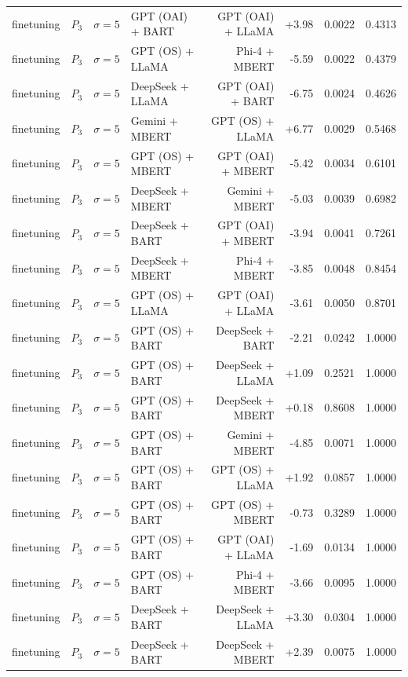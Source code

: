 \begin{table}[htbp]
\begin{tabular*}{\textwidth}{@{\extracolsep{\fill}}llllrrrl}
finetuning & $P_3$ & $\sigma{=}5$ & GPT (OAI) + BART & GPT (OAI) + LLaMA & +3.98 & 0.0022 & 0.4313 \\
finetuning & $P_3$ & $\sigma{=}5$ & GPT (OS) + LLaMA & Phi-4 + MBERT & -5.59 & 0.0022 & 0.4379 \\
finetuning & $P_3$ & $\sigma{=}5$ & DeepSeek + LLaMA & GPT (OAI) + BART & -6.75 & 0.0024 & 0.4626 \\
finetuning & $P_3$ & $\sigma{=}5$ & Gemini + MBERT & GPT (OS) + LLaMA & +6.77 & 0.0029 & 0.5468 \\
finetuning & $P_3$ & $\sigma{=}5$ & GPT (OS) + MBERT & GPT (OAI) + MBERT & -5.42 & 0.0034 & 0.6101 \\
finetuning & $P_3$ & $\sigma{=}5$ & DeepSeek + MBERT & Gemini + MBERT & -5.03 & 0.0039 & 0.6982 \\
finetuning & $P_3$ & $\sigma{=}5$ & DeepSeek + BART & GPT (OAI) + MBERT & -3.94 & 0.0041 & 0.7261 \\
finetuning & $P_3$ & $\sigma{=}5$ & DeepSeek + MBERT & Phi-4 + MBERT & -3.85 & 0.0048 & 0.8454 \\
finetuning & $P_3$ & $\sigma{=}5$ & GPT (OS) + LLaMA & GPT (OAI) + LLaMA & -3.61 & 0.0050 & 0.8701 \\
finetuning & $P_3$ & $\sigma{=}5$ & GPT (OS) + BART & DeepSeek + BART & -2.21 & 0.0242 & 1.0000 \\
finetuning & $P_3$ & $\sigma{=}5$ & GPT (OS) + BART & DeepSeek + LLaMA & +1.09 & 0.2521 & 1.0000 \\
finetuning & $P_3$ & $\sigma{=}5$ & GPT (OS) + BART & DeepSeek + MBERT & +0.18 & 0.8608 & 1.0000 \\
finetuning & $P_3$ & $\sigma{=}5$ & GPT (OS) + BART & Gemini + MBERT & -4.85 & 0.0071 & 1.0000 \\
finetuning & $P_3$ & $\sigma{=}5$ & GPT (OS) + BART & GPT (OS) + LLaMA & +1.92 & 0.0857 & 1.0000 \\
finetuning & $P_3$ & $\sigma{=}5$ & GPT (OS) + BART & GPT (OS) + MBERT & -0.73 & 0.3289 & 1.0000 \\
finetuning & $P_3$ & $\sigma{=}5$ & GPT (OS) + BART & GPT (OAI) + LLaMA & -1.69 & 0.0134 & 1.0000 \\
finetuning & $P_3$ & $\sigma{=}5$ & GPT (OS) + BART & Phi-4 + MBERT & -3.66 & 0.0095 & 1.0000 \\
finetuning & $P_3$ & $\sigma{=}5$ & DeepSeek + BART & DeepSeek + LLaMA & +3.30 & 0.0304 & 1.0000 \\
finetuning & $P_3$ & $\sigma{=}5$ & DeepSeek + BART & DeepSeek + MBERT & +2.39 & 0.0075 & 1.0000 \\

\end{tabular*}
\end{table}
